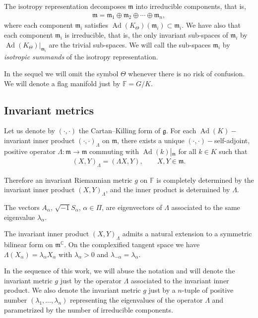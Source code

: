 \documentclass[pdftex]{sigma}%
\numberwithin{equation}{section}
\DeclareMathOperator{\Ad}{Ad}
\begin{document}
The isotropy representation decomposes $\mathfrak{m}$ into irreducible components, that is,
\begin{gather*}
\mathfrak{m}=\mathfrak{m}_{1}\oplus\mathfrak{m}_{2}\oplus\cdots\oplus\mathfrak{m}_{n},
\end{gather*}
where each component $\mathfrak{m}_{i}$ satisfies $\Ad(K_{\Theta})(\mathfrak{m}_{i})\subset \mathfrak{m}_{i}$.
We have also that each component $\mathfrak{m}_{i}$ is irreducible, that is, the only invariant sub-spaces of $\mathfrak{m}_{i}$ by $\Ad(K_{\Theta})|_{\mathfrak{m}_{i}}$ are the trivial sub-spaces. We will call the sub-spaces $\mathfrak{m}_{i}$ by {\it isotropic summands} of the isotropy representation.

\begin{Remark}
In the sequel we will omit the symbol $\Theta$ whenever there is no risk of confusion. We will denote a flag manifold just by $\mathbb{F}=G/K$.
\end{Remark}


\subsection{Invariant metrics}
Let us denote by $(\cdot,\cdot)$ the Cartan--Killing form of $\mathfrak{g}$. For each $\Ad(K)-$invariant inner product $(\cdot ,\cdot)_{\Lambda}$ on $\mathfrak{m}$, there exists a unique $(\cdot,\cdot)-$self-adjoint, positive operator $\Lambda \colon \mathfrak{m}\longrightarrow\mathfrak{m}$ commuting with $\Ad(k)\left|_{\mathfrak{m}}\right.$ for all $k\in K$ such that
\begin{gather*}
(X,Y)_{\Lambda}=(\Lambda X,Y), \qquad X,Y\in\mathfrak{m}.
\end{gather*}

Therefore an invariant Riemannian metric $g$ on $\mathbb{F}$ is completely determined by the invariant inner product $(X,Y)_{\Lambda}$, and the inner product is determined by $\Lambda$.

The vectors $A_{\alpha}$, $\sqrt{-1}S_{\alpha}$, $\alpha\in\Pi$, are eigenvectors of $\Lambda$ associated to the same eigenvalue $\lambda_\alpha$.

The invariant inner product $(X,Y)_{\Lambda}$ admits a natural extension to a symmetric bilinear form on $\mathfrak{m}^{\mathbb{C}}$. On the complexified tangent space we have $\Lambda(X_{\alpha})=\lambda_{\alpha}X_{\alpha}$ with $\lambda_{\alpha}>0$ and $\lambda_{-\alpha}=\lambda_{\alpha}$.

\begin{Notation}
In the sequence of this work, we will abuse the notation and will denote the invariant metric $g$ just by the operator $\Lambda$ associated to the invariant inner product. We also denote the invariant metric $g$ just by a $n$-tuple of positive number $(\lambda_1,\ldots, \lambda_n)$ representing the eigenvalues of the operator $\Lambda$ and parametrized by the number of irreducible components.
\end{Notation}
\end{document}
